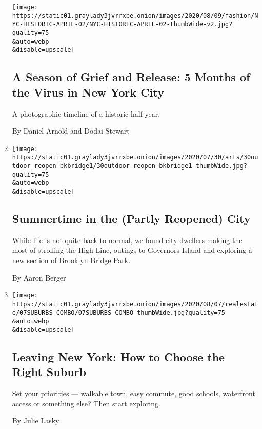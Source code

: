 \begin{enumerate}
  \texttt{[image: https://static01.graylady3jvrrxbe.onion/images/2020/08/09/fashion/NYC-HISTORIC-APRIL-02/NYC-HISTORIC-APRIL-02-thumbWide-v2.jpg?quality=75\\\&auto=webp\\\&disable=upscale]}

  \hypertarget{a-season-of-grief-and-release-5-months-of-the-virus-in-new-york-city}{%
  \subsection{A Season of Grief and Release: 5 Months of the Virus in
  New York
  City}\label{a-season-of-grief-and-release-5-months-of-the-virus-in-new-york-city}}

  A photographic timeline of a historic half-year.

  By Daniel Arnold and Dodai Stewart
\item
  \href{/2020/08/07/arts/design/high-line-governors-island-brooklyn-bridge-park.html}{}

  \texttt{[image: https://static01.graylady3jvrrxbe.onion/images/2020/07/30/arts/30outdoor-reopen-bkbridge1/30outdoor-reopen-bkbridge1-thumbWide.jpg?quality=75\\\&auto=webp\\\&disable=upscale]}

  \hypertarget{summertime-in-the-partly-reopened-city}{%
  \subsection{Summertime in the (Partly Reopened)
  City}\label{summertime-in-the-partly-reopened-city}}

  While life is not quite back to normal, we found city dwellers making
  the most of strolling the High Line, outings to Governors Island and
  exploring a new section of Brooklyn Bridge Park.

  By Aaron Berger
\item
  \href{/2020/08/07/realestate/coronavirus-escape-suburbs-new-york.html}{}

  \texttt{[image: https://static01.graylady3jvrrxbe.onion/images/2020/08/07/realestate/07SUBURBS-COMBO/07SUBURBS-COMBO-thumbWide.jpg?quality=75\\\&auto=webp\\\&disable=upscale]}

  \hypertarget{leaving-new-york-how-to-choose-the-right-suburb}{%
  \subsection{Leaving New York: How to Choose the Right
  Suburb}\label{leaving-new-york-how-to-choose-the-right-suburb}}

  Set your priorities --- walkable town, easy commute, good schools,
  waterfront access or something else? Then start exploring.

  By Julie Lasky
\end{enumerate}

